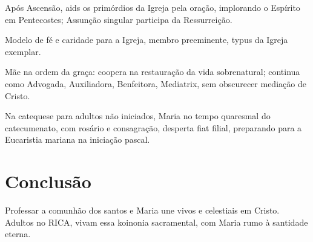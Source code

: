 Após Ascensão, aids os primórdios da Igreja pela oração, implorando o Espírito em Pentecostes; Assunção singular participa da Ressurreição.

Modelo de fé e caridade para a Igreja, membro preeminente, typus da Igreja exemplar.

Mãe na ordem da graça: coopera na restauração da vida sobrenatural; continua como Advogada, Auxiliadora, Benfeitora, Mediatrix, sem obscurecer mediação de Cristo.

Na catequese para adultos não iniciados, Maria no tempo quaresmal do catecumenato, com rosário e consagração, desperta fiat filial, preparando para a Eucaristia mariana na iniciação pascal.

\section{Conclusão}

Professar a comunhão dos santos e Maria une vivos e celestiais em Cristo. Adultos no RICA, vivam essa koinonia sacramental, com Maria rumo à santidade eterna.